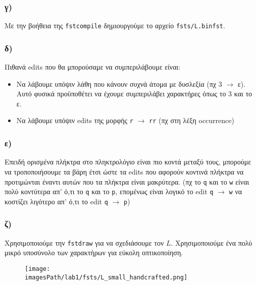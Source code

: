 \documentclass[a4paper, 12pt]{article}
\newcommand{\imagesPath}{.}
\begin{document}
        \subsubsection*{γ)}
        	Με την βοήθεια της \verb|fstcompile| δημιουργούμε το αρχείο \verb|fsts/L.binfst|. 
        
        \subsubsection*{δ)}
        	Πιθανά edits που θα μπορούσαμε να συμπεριλάβουμε είναι:
        	
        	\begin{itemize}
        		\item Να λάβουμε υπόψιν λάθη που κάνουν συχνά άτομα με δυσλεξία (πχ 3 $\rightarrow$ ε). Αυτό φυσικά προϋποθέτει να έχουμε συμπεριλάβει χαρακτήρες όπως το 3 και το ε.
        		\item Να λάβουμε υπόψιν edits της μορφής \verb|r| $\rightarrow$ \verb|rr| (πχ στη λέξη occurrence)
        	\end{itemize}
        	
        \subsubsection*{ε)}
			Επειδή ορισμένα πλήκτρα στο πληκτρολόγιο είναι πιο κοντά μεταξύ τους, μπορούμε να τροποποιήσουμε τα βάρη έτσι ώστε τα edits που αφορούν κοντινά πλήκτρα να προτιμώνται έναντι αυτών που τα πλήκτρα είναι μακρύτερα. (πχ το \verb|q| και το \verb|w| είναι πολύ κοντύτερα απ' ό,τι το \verb|q| και το \verb|p|, επομένως είναι λογικό το edit \verb|q| $\rightarrow$ \verb|w| να κοστίζει λιγότερο απ' ό,τι το edit \verb|q| $\rightarrow$ \verb|p|) 

        	
        \subsubsection*{ζ)}
			Χρησιμοποιούμε την \verb|fstdraw| για να σχεδιάσουμε τον $L$. Χρησιμοποιούμε ένα πολύ μικρό υποσύνολο των χαρακτήρων για εύκολη οπτικοποίηση.
			

			\begin{figure}[H]
				\begin{center}
					\texttt{[image: \\imagesPath/lab1/fsts/L\_small\_handcrafted.png]}
				\end{center}
			\end{figure}
			
\end{document}
